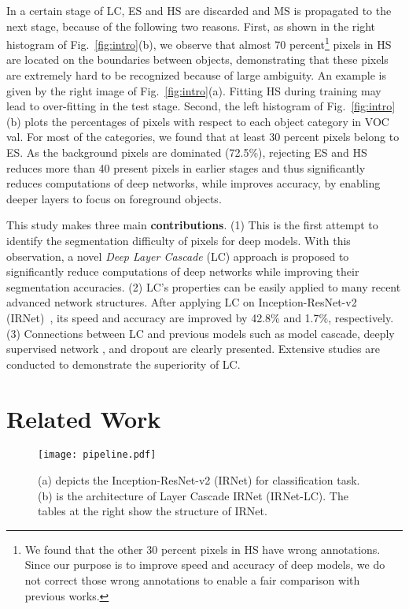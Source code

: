 \documentclass[10pt,twocolumn,letterpaper]{article}
\begin{document}
In a certain stage of LC, ES and HS are discarded and MS is propagated to the next stage, because of the following two reasons.
First, as shown in the right histogram of Fig.~\ref{fig:intro}(b), we observe that almost 70 percent\footnote{We found that the other 30 percent pixels in HS have wrong annotations. Since our purpose is to improve speed and accuracy of deep models, we do not correct those wrong annotations to enable a fair comparison with previous works.} pixels in HS are located on the boundaries between objects, demonstrating that these pixels are extremely hard to be recognized because of large ambiguity.
An example is given by the right image of Fig.~\ref{fig:intro}(a).
Fitting HS during training may lead to over-fitting in the test stage.
Second, the left histogram of Fig.~\ref{fig:intro}(b) plots the percentages of pixels with respect to each object category in VOC val.
For most of the categories, we found that at least 30 percent pixels belong to ES.
As the background pixels are dominated (72.5\%), rejecting ES and HS reduces more than 40 present pixels in earlier stages and thus significantly reduces computations of deep networks, while improves accuracy, by
enabling deeper layers to focus on foreground objects.


This study makes three main \textbf{contributions}.
(1) This is the first attempt to identify the segmentation difficulty of pixels for deep models.
With this observation, a novel \emph{Deep Layer Cascade} (LC) approach is proposed to significantly reduce computations of deep networks while improving their segmentation accuracies.
(2) LC's 
properties can be easily applied to many recent advanced network structures.
After applying LC on Inception-ResNet-v2 (IRNet)~\cite{szegedy2016inception}, its speed and accuracy are improved by 42.8\% and 1.7\%, respectively.
(3) Connections between LC and previous models such as model cascade, deeply supervised network \cite{lee2015deeply}, and dropout \cite{srivastava2014dropout} are clearly presented.
Extensive studies are conducted to demonstrate the superiority of LC.



 

\section{Related Work}
\label{sec:related_work}


\begin{figure*}[t]
	\centering
	\texttt{[image: pipeline.pdf]}
	\vskip -0.3cm
	\caption{\small{(a) depicts the Inception-ResNet-v2 (IRNet) for classification task. (b) is the architecture of Layer Cascade IRNet (IRNet-LC). The tables at the right show the structure of IRNet.}}
	\label{fig:model_architecture}
    \vspace{-10pt}
\end{figure*}
\end{document}
